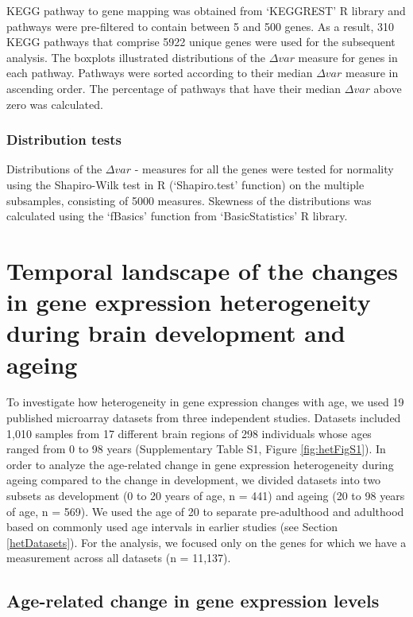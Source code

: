 \documentclass[12pt,twoside]{unicam}
\begin{document}
KEGG pathway to gene mapping was obtained from `KEGGREST' R library and pathways were pre-filtered to contain between 5 and 500 genes. As a result, 310 KEGG pathways that comprise 5922 unique genes were used for the subsequent analysis. The boxplots illustrated distributions of the \(\Delta var\) measure for genes in each pathway. Pathways were sorted according to their median \(\Delta var\) measure in ascending order. The percentage of pathways that have their median \(\Delta var\) above zero was calculated.

\hypertarget{distribution-tests}{%
\subsubsection{Distribution tests}\label{distribution-tests}}

Distributions of the \(\Delta var\) - measures for all the genes were tested for normality using the Shapiro-Wilk test in R (`Shapiro.test' function) on the multiple subsamples, consisting of 5000 measures. Skewness of the distributions was calculated using the `fBasics' function from `BasicStatistics' R library.

\hypertarget{ulasresults}{%
\section{Temporal landscape of the changes in gene expression heterogeneity during brain development and ageing}\label{ulasresults}}

To investigate how heterogeneity in gene expression changes with age, we used 19 published microarray datasets from three independent studies. Datasets included 1,010 samples from 17 different brain regions of 298 individuals whose ages ranged from 0 to 98 years (Supplementary Table S1, Figure \ref{fig:hetFigS1}). In order to analyze the age-related change in gene expression heterogeneity during ageing compared to the change in development, we divided datasets into two subsets as development (0 to 20 years of age, n = 441) and ageing (20 to 98 years of age, n = 569). We used the age of 20 to separate pre-adulthood and adulthood based on commonly used age intervals in earlier studies (see Section \ref{hetDatasets}). For the analysis, we focused only on the genes for which we have a measurement across all datasets (n = 11,137).

\hypertarget{age-related-change-in-gene-expression-levels}{%
\subsection{Age-related change in gene expression levels}\label{age-related-change-in-gene-expression-levels}}
\end{document}
